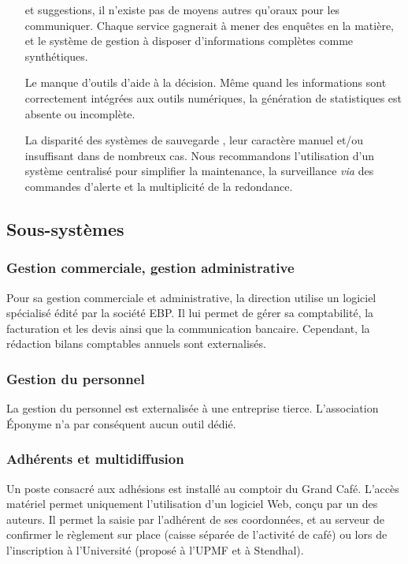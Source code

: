 \begin{enumerate}
      et suggestions, il n'existe pas de moyens autres qu'oraux pour les communiquer.
      Chaque service gagnerait à mener des enquêtes en la matière, et le système de gestion
      à disposer d'informations complètes comme synthétiques.
\item[Le manque d'outils d'aide à la décision.] Même quand les informations sont correctement
      intégrées aux outils numériques, la génération de statistiques est absente ou
      incomplète.
\item[La disparité des systèmes de sauvegarde], leur caractère manuel et/ou insuffisant
      dans de nombreux cas.
      Nous recommandons l'utilisation d'un système centralisé pour simplifier la maintenance,
      la surveillance \textit{via} des commandes d'alerte et la multiplicité de la redondance.
\end{enumerate}

\subsection{Sous-systèmes}

\subsubsection{Gestion commerciale, gestion administrative}

Pour sa gestion commerciale et administrative, la direction utilise un logiciel spécialisé
 édité par la société EBP.
Il lui permet de gérer sa comptabilité, la facturation et les devis ainsi que la
communication bancaire. Cependant, la rédaction bilans comptables annuels sont externalisés.

\subsubsection{Gestion du personnel}

La gestion du personnel est externalisée à une entreprise tierce.
L'association Éponyme n'a par conséquent aucun outil dédié.

\subsubsection{Adhérents et multidiffusion}

Un poste consacré aux adhésions est installé au comptoir du Grand Café.
L'accès matériel permet uniquement l'utilisation d'un logiciel Web, conçu par un des auteurs.
Il permet la saisie par l'adhérent de ses coordonnées, et au serveur de confirmer
le règlement sur place (caisse séparée de l'activité de café) ou lors de l'inscription
à l'Université (proposé à l'UPMF et à Stendhal).

